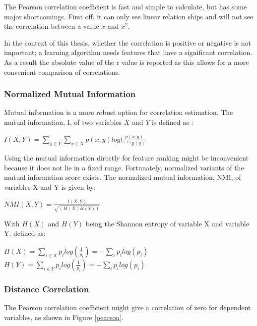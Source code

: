 \npar

The Pearson correlation coefficient is fast and simple to calculate, but has some major shortcomings. First off, it can only see linear relation ships and will not see the correlation between a value $x$ and $x^2$.

\npar

In the context of this thesis, whether the correlation is positive or negative is not important; a learning algorithm needs features that have a significant correlation. As a result the absolute value of the r value is reported as this allows for a more convenient comparison of correlations.

\subsubsection{Normalized Mutual Information}
Mutual information is a more robust option for correlation estimation. The mutual information, I, of two variables $X$ and $Y$ is defined as \citep{mutPaper}:
\begin{center}
$I(X,Y) = \sum\limits_{y\in Y} \sum\limits_{x\in X} p(x,y)log(\frac{p(x,y)}{^(x)p(y)}$
\end{center}

\npar

Using the mutual information directly for feature ranking might be inconvenient because it does not lie in a fixed range. Fortunately, normalized variants of the mutual information score exists. The normalized mutual information, NMI, of variables X and Y is given by:

\begin{center}
$NMI(X,Y) = \frac{I(X,Y)}{\sqrt{(H(X)H(Y))}}$
\end{center}

With $H(X)$ and $H(Y)$ being the Shannon entropy of variable X and variable Y, defined as:

\begin{center}
$H(X) = \sum\limits_{i\in X} p_ilog(\frac{1}{p_i}) = - \sum\limits_i p_ilog(p_i)$\\
$H(Y) = \sum\limits_{i\in Y} p_ilog(\frac{1}{p_i}) = - \sum\limits_i p_ilog(p_i)$

\end{center}

\subsubsection{Distance Correlation}
The Pearson correlation coefficient might give a correlation of zero for dependent variables, as shown in Figure \ref{pearson}.


